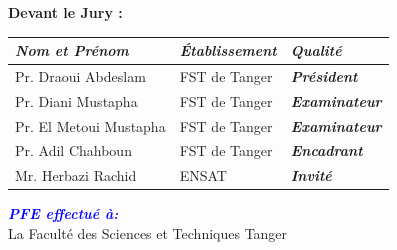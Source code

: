 \begin{titlepage}
\textbf{Devant le Jury :\hfill\phantom{}}\\[.5cm]
\setlength\extrarowheight{5pt} %
    \begin{tabularx}{\textwidth}{|X|X|X|}
    \hline
       \textbf{\textit{Nom et Prénom}} & \textbf{\textit{Établissement}} & \textbf{\textit{Qualité}} \\
       \hline
        Pr. Draoui Abdeslam    & FST de Tanger & \textbf{\textit{Président}} \\
        \hline
        Pr. Diani Mustapha     & FST de Tanger & \textbf{\textit{Examinateur}} \\
        \hline
        Pr. El Metoui Mustapha & FST de Tanger & \textbf{\textit{Examinateur}} \\
        \hline
        Pr. Adil Chahboun      & FST de Tanger & \textbf{\textit{Encadrant}} \\
        \hline
        Mr. Herbazi Rachid     & ENSAT         & \textbf{\textit{Invité}}\\
        \hline
    \end{tabularx}

\vfill
\textit{\textbf{\textcolor{blue}{PFE effectué à:}}}\\
La Faculté des Sciences et Techniques Tanger

\end{titlepage}
